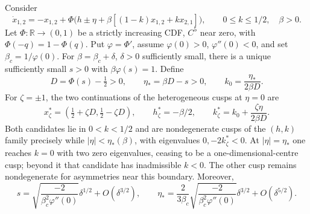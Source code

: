 Consider
\[
 \dot x_{1,2}=-x_{1,2}+
 \Phi\bigl(h\pm\eta+\beta[(1-k)x_{1,2}+kx_{2,1}]\bigr),
 \qquad 0\le k\le1/2,\quad\beta>0.
\]
Let $\Phi:\mathbb R\to(0,1)$ be a strictly increasing CDF, $C^5$ near zero,
with $\Phi(-q)=1-\Phi(q)$. Put $\varphi=\Phi'$, assume $\varphi(0)>0$, $\varphi''(0)<0$,
and set $\beta_c=1/\varphi(0)$. For $\beta=\beta_c+\delta$, $\delta>0$
sufficiently small, there is a unique sufficiently small $s>0$ with
$\beta\varphi(s)=1$. Define
\[
 D=\Phi(s)-\tfrac12>0,\qquad \eta_* =\beta D-s>0,\qquad
 k_0=\frac{\eta_*}{2\beta D}.
\]
For $\zeta=\pm1$, the two continuations of the heterogeneous cusps at
$\eta=0$ are
\[
 x_\zeta^*=(\tfrac12+\zeta D,\tfrac12-\zeta D),\qquad
 h_\zeta^*=-\beta/2,\qquad k_\zeta^*=k_0+\frac{\zeta\eta}{2\beta D}.
\]
Both candidates lie in $0<k<1/2$ and are nondegenerate cusps of
the $(h,k)$ family precisely while
$|\eta|<\eta_*(\beta)$, with eigenvalues $0,-2k_\zeta^*<0$.
At $|\eta|=\eta_*$ one reaches $k=0$ with two zero eigenvalues,
ceasing to be a one-dimensional-centre cusp; beyond it that candidate
has inadmissible $k<0$. The other cusp remains nondegenerate for
asymmetries near this boundary. Moreover,
\[
 s=\sqrt{\frac{-2}{\beta_c^2\varphi''(0)}}\delta^{1/2}+O(\delta^{3/2}),\qquad
 \eta_* =\frac{2}{3\beta_c}\sqrt{\frac{-2}{\beta_c^2\varphi''(0)}}
 \delta^{3/2}+O(\delta^{5/2}).
\]
\eeT
